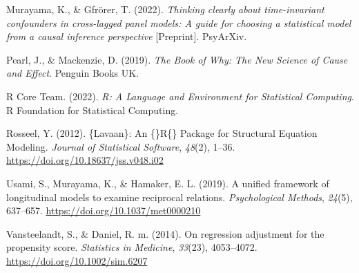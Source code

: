 \documentclass[
]{interact}
\newlength{\cslhangindent}
\newlength{\cslentryspacingunit} %
\newenvironment{CSLReferences}[2] %
 {%
  \setlength{\parindent}{0pt}
  \ifodd #1
  \let\oldpar\par
  \def\par{\hangindent=\cslhangindent\oldpar}
  \fi
  \setlength{\parskip}{#2\cslentryspacingunit}
 }%
 {}
\begin{document}
\begin{CSLReferences}{1}{0}
\leavevmode{}%
Murayama, K., \& Gfrörer, T. (2022). \emph{Thinking clearly about
time-invariant confounders in cross-lagged panel models: {A} guide for
choosing a statistical model from a causal inference perspective}
{[}Preprint{]}. {PsyArXiv}.

\leavevmode{}%
Pearl, J., \& Mackenzie, D. (2019). \emph{The {Book} of {Why}: {The New
Science} of {Cause} and {Effect}}. {Penguin Books UK}.

\leavevmode{}%
R Core Team. (2022). \emph{R: {A Language} and {Environment} for
{Statistical Computing}}. {R Foundation for Statistical Computing}.

\leavevmode{}%
Rosseel, Y. (2012). \{Lavaan\}: {An} \{\vphantom\}{R}\vphantom\{\}
{Package} for {Structural Equation Modeling}. \emph{Journal of
Statistical Software}, \emph{48}(2), 1--36.
\url{https://doi.org/10.18637/jss.v048.i02}

\leavevmode{}%
Usami, S., Murayama, K., \& Hamaker, E. L. (2019). A unified framework
of longitudinal models to examine reciprocal relations.
\emph{Psychological Methods}, \emph{24}(5), 637--657.
\url{https://doi.org/10.1037/met0000210}

\leavevmode{}%
Vansteelandt, S., \& Daniel, R. m. (2014). On regression adjustment for
the propensity score. \emph{Statistics in Medicine}, \emph{33}(23),
4053--4072. \url{https://doi.org/10.1002/sim.6207}

\end{CSLReferences}
\end{document}

